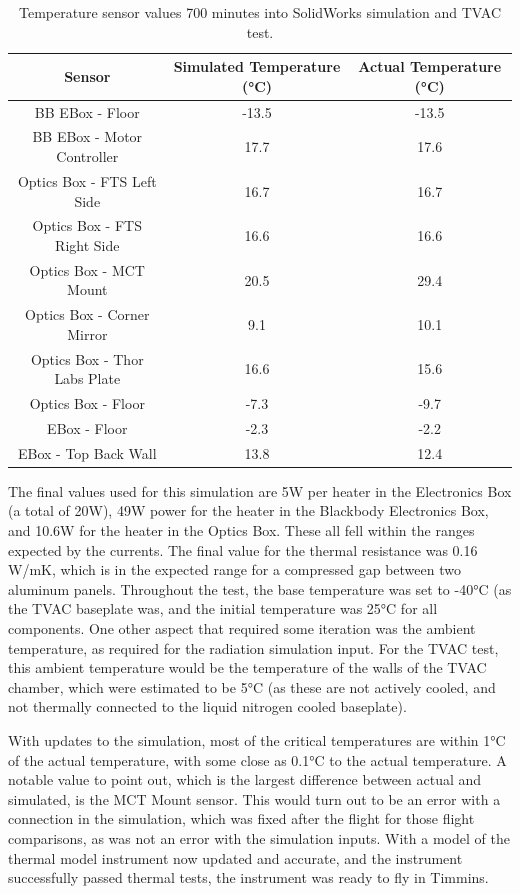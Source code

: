\begin{table}[h]
\begin{center}
\begin{tabular}{ |c|c|c| }
 \hline
 \rowcolor{lightgray}
 Sensor & Simulated Temperature (°C) & Actual Temperature (°C)\\
  \hline
  \hline
  BB EBox - Floor & -13.5 & -13.5\\
 \hline
  BB EBox - Motor Controller & 17.7 & 17.6\\
 \hline
 Optics Box - FTS Left Side & 16.7 & 16.7\\
 \hline
 Optics Box - FTS Right Side & 16.6 & 16.6\\
 \hline
 Optics Box - MCT Mount & 20.5 & 29.4\\
 \hline
 Optics Box - Corner Mirror & 9.1 & 10.1\\
 \hline
 Optics Box - Thor Labs Plate & 16.6 & 15.6\\
 \hline
 Optics Box - Floor & -7.3 & -9.7\\
 \hline
 EBox - Floor & -2.3 & -2.2\\
 \hline
 EBox - Top Back Wall & 13.8 & 12.4\\
 \hline
\end{tabular}
\end{center}
\caption{Temperature sensor values 700 minutes into SolidWorks simulation and TVAC test.}
 \label{TVAC_temps}
\end{table}

The final values used for this simulation are 5W per heater in the Electronics Box (a total of 20W), 49W power for the heater in the Blackbody Electronics Box, and 10.6W for the heater in the Optics Box. These all fell within the ranges expected by the currents. The final value for the thermal resistance was 0.16 W/mK, which is in the expected range for a compressed gap between two aluminum panels. Throughout the test, the base temperature was set to -40°C (as the TVAC baseplate was, and the initial temperature was 25°C for all components. One other aspect that required some iteration was the ambient temperature, as required for the radiation simulation input. For the TVAC test, this ambient temperature would be the temperature of the walls of the TVAC chamber, which were estimated to be 5°C (as these are not actively cooled, and not thermally connected to the liquid nitrogen cooled baseplate).

With updates to the simulation, most of the critical temperatures are within 1°C of the actual temperature, with some close as 0.1°C to the actual temperature. A notable value to point out, which is the largest difference between actual and simulated, is the MCT Mount sensor. This would turn out to be an error with a connection in the simulation, which was fixed after the flight for those flight comparisons, as was not an error with the simulation inputs. With a model of the thermal model instrument now updated and accurate, and the instrument successfully passed thermal tests, the instrument was ready to fly in Timmins.